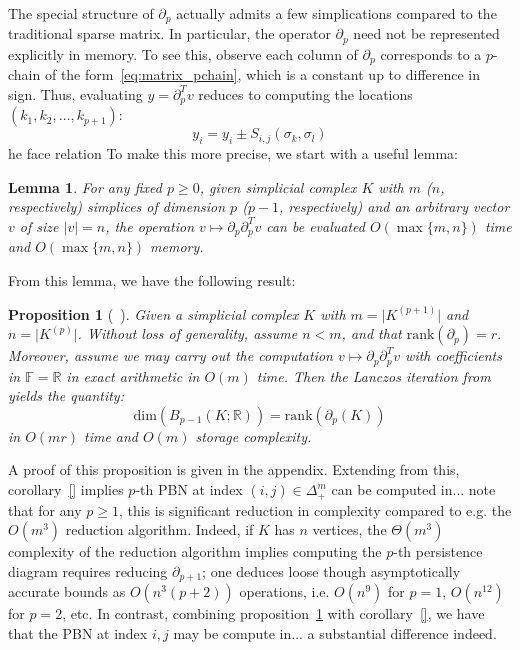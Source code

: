 \documentclass[10pt]{article}
\newcommand{\+}{%
	\raisebox{0.18ex}{\scaleobj{0.55}{+}}
}
\newtheorem{proposition}{Proposition}
\newtheorem{lemma}{Lemma}
\begin{document}
The special structure of $\partial_p$ actually admits a few simplications compared to the traditional sparse matrix. In particular, the operator $\partial_p$ need not be represented explicitly in memory. To see this, observe each column of $\partial_p$ corresponds to a $p$-chain of the form~\eqref{eq:matrix_pchain}, which is a constant up to difference in sign. Thus, evaluating $y = \partial_p^T v$ reduces to computing the locations $(k_1, k_2, \dots, k_{p+1})$:
\begin{equation}
	y_{i} = y_i \pm S_{i,j}(\sigma_k, \sigma_l)
\end{equation}
he face relation 
To make this more precise, we start with a useful lemma:
\begin{lemma}
For any fixed $p \geq 0$, given simplicial complex $K$ with $m$ ($n$, respectively) simplices of dimension $p$ ($p - 1$, respectively) and an arbitrary vector $v$ of size $\lvert v \rvert = n$, the operation $v \mapsto \partial_p \partial_p^T v$ can be evaluated $O(\max \{m,n\})$ time and $O(\max \{m,n\})$ memory. 
\end{lemma}
From this lemma, we have the following result: 
\begin{proposition}[~\cite{}]\label{prop:exact_arith_matvec}
	Given a simplicial complex $K$ with $m = \lvert K^{(p+1)} \rvert$ and $n = \lvert K^{(p)} \rvert$. Without loss of generality, assume $n < m$, and that $\mathrm{rank}(\partial_p) = r$. 
	Moreover, assume we may carry out the computation $v \mapsto \partial_p \partial_p^T v$ with coefficients in $\mathbb{F} = \mathbb{R}$ in exact arithmetic in $O(m)$ time. 
	Then the Lanczos iteration from~\cite{} yields the quantity:
	\begin{equation}
		\mathrm{dim}(B_{p-1}(K; \mathbb{R})) = \mathrm{rank}(\partial_p(K))
	\end{equation}
	in $O(mr)$ time and $O(m)$ storage complexity. 
\end{proposition}
\noindent A proof of this proposition is given in the appendix. Extending from this, corollary~\ref{} implies $p$-th PBN at index $(i,j) \in \Delta_{+}^{m}$ can be computed in... note that for any $p \geq 1$, this is significant reduction in complexity compared to e.g. the $O(m^3)$ reduction algorithm.
Indeed, if $K$ has $n$ vertices, the $\Theta(m^3)$ complexity of the reduction algorithm implies computing the $p$-th persistence diagram requires reducing $\partial_{p+1}$; one deduces loose though asymptotically accurate bounds as $O(n^3(p+2))$ operations, i.e. $O(n^9)$ for $p = 1$, $O(n^{12})$ for $p = 2$, etc. In contrast, combining proposition~\ref{prop:exact_arith_matvec} with corollary~\ref{}, we have that the PBN at index $i,j$ may be compute in... a substantial difference indeed. 
\end{document}
